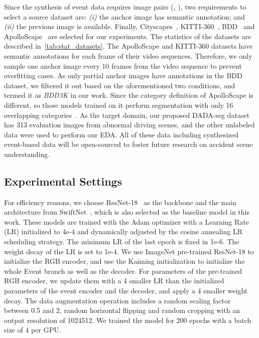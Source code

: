 \documentclass[letterpaper, 10 pt, conference]{ieeeconf}
\begin{document}
Since the synthesis of event data requires image pairs (, ), two requirements to select a source dataset are: \textit{(i)} the anchor image  has semantic annotation; and \textit{(ii)} the previous image  is available. Finally, Cityscapes~\cite{cordts2016cityscapes}, KITTI-360~\cite{xie2016semantic}, BDD~\cite{yu2020bdd100k} and ApolloScape~\cite{wang2019apolloscape} are selected for our experiments. The statistics of the datasets are described in~\cref{tab:stat_datasets}.
The ApolloScape and KITTI-360 datasets have semantic annotations for each frame of their video sequences. Therefore, we only sample one anchor image every 10 frames from the video sequence to prevent overfitting cases. As only partial anchor images have annotations in the BDD dataset, we filtered it out based on the aforementioned two conditions, and termed it as \textit{BDD3K} in our work. Since the category definition of ApolloScape is different, so those models trained on it perform segmentation with only 16 overlapping categories~\cite{wang2019apolloscape}. 
As the target domain, our proposed DADA-seg dataset has 313 evaluation images from abnormal driving scenes, and the other unlabeled data were used to perform our EDA. All of these data including synthesized event-based data will be open-sourced to foster future research on accident scene understanding.

\subsection{Experimental Settings}
For efficiency reasons, we choose ResNet-18~\cite{he2016resnet} as the backbone and the main architecture from SwiftNet~\cite{orsic2019swiftnet}, which is also selected as the baseline model in this work. These models are trained with the Adam optimizer with a Learning Rate (LR) initialized to 4e-4 and dynamically adjusted by the cosine annealing LR scheduling strategy. The minimum LR of the last epoch is fixed in 1e-6. The weight decay of the LR is set to 1e-4. We use ImageNet pre-trained ResNet-18 to initialize the RGB encoder, and use the Kaiming initialization to initialize the whole Event branch as well as the decoder. For parameters of the pre-trained RGB encoder, we update them with a 4 smaller LR than the initialized parameters of the event encoder and the decoder, and apply a 4 smaller weight decay. The data augmentation operation includes a random scaling factor between 0.5 and 2, random horizontal flipping and random cropping with an output resolution of 1024512. We trained the model for 200 epochs with a batch size of 4 per GPU.
\end{document}
